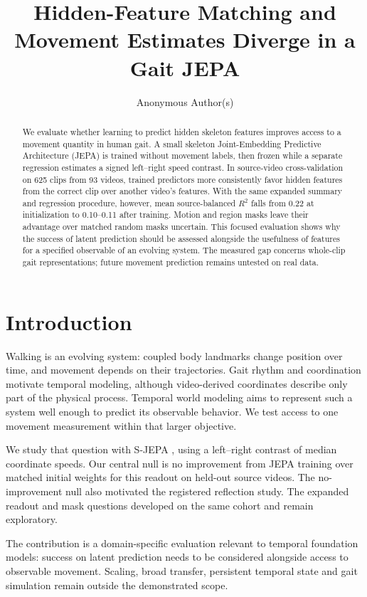 \documentclass{article}
\title{Hidden-Feature Matching and Movement Estimates Diverge in a Gait JEPA}
\author{Anonymous Author(s)}
\begin{document}
\maketitle
\begin{abstract}
We evaluate whether learning to predict hidden skeleton features
improves access to a movement quantity in human gait. A small skeleton
Joint-Embedding Predictive Architecture (JEPA) is trained without
movement labels, then frozen while a separate regression estimates a
signed left--right speed contrast. In source-video cross-validation on
625 clips from 93 videos, trained predictors more consistently favor
hidden features from the correct clip over another video's features.
With the same expanded summary and regression procedure, however, mean
source-balanced \(R^2\) falls from 0.22 at initialization to 0.10--0.11
after training. Motion and region masks leave their advantage over
matched random masks uncertain. This focused evaluation shows why the
success of latent prediction should be assessed alongside the usefulness
of features for a specified observable of an evolving system. The
measured gap concerns whole-clip gait representations; future movement
prediction remains untested on real data.
\end{abstract}
\section{Introduction}\label{introduction}

Walking is an evolving system: coupled body landmarks change position
over time, and movement depends on their trajectories. Gait rhythm and
coordination motivate temporal modeling, although video-derived
coordinates describe only part of the physical process. Temporal world
modeling aims to represent such a system well enough to predict its
observable behavior. We test access to one movement measurement within
that larger objective.

We study that question with S-JEPA \citep{sjepa}, using a left--right
contrast of median coordinate speeds. Our central null is no improvement
from JEPA training over matched initial weights for this readout on
held-out source videos. The no-improvement null also motivated the
registered reflection study. The expanded readout and mask questions
developed on the same cohort and remain exploratory.

The contribution is a domain-specific evaluation relevant to temporal
foundation models: success on latent prediction needs to be considered
alongside access to observable movement. Scaling, broad transfer,
persistent temporal state and gait simulation remain outside the
demonstrated scope.
\end{document}
